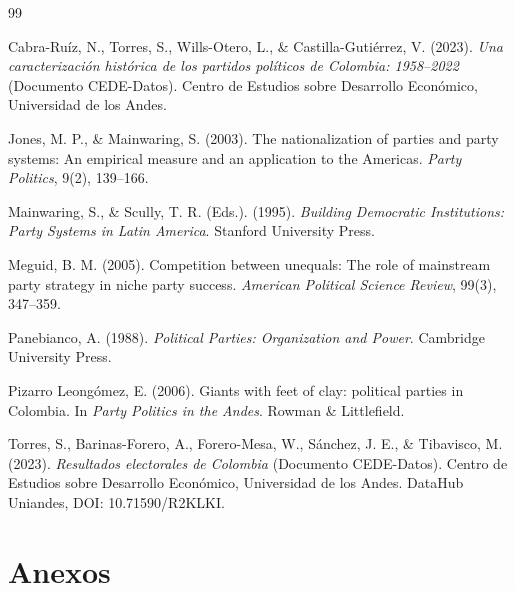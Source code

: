 \documentclass[11pt,letterpaper]{article}
\begin{document}
\begin{thebibliography}{99}
\setlength{\itemsep}{0.4em}

 Cabra-Ruíz, N., Torres, S., Wills-Otero, L., \& Castilla-Gutiérrez, V. (2023). \textit{Una caracterización histórica de los partidos políticos de Colombia: 1958--2022} (Documento CEDE-Datos). Centro de Estudios sobre Desarrollo Económico, Universidad de los Andes.

 Jones, M. P., \& Mainwaring, S. (2003). The nationalization of parties and party systems: An empirical measure and an application to the Americas. \textit{Party Politics}, 9(2), 139--166.

 Mainwaring, S., \& Scully, T. R. (Eds.). (1995). \textit{Building Democratic Institutions: Party Systems in Latin America}. Stanford University Press.

 Meguid, B. M. (2005). Competition between unequals: The role of mainstream party strategy in niche party success. \textit{American Political Science Review}, 99(3), 347--359.

 Panebianco, A. (1988). \textit{Political Parties: Organization and Power}. Cambridge University Press.

 Pizarro Leongómez, E. (2006). Giants with feet of clay: political parties in Colombia. In \textit{Party Politics in the Andes}. Rowman \& Littlefield.

 Torres, S., Barinas-Forero, A., Forero-Mesa, W., Sánchez, J. E., \& Tibavisco, M. (2023). \textit{Resultados electorales de Colombia} (Documento CEDE-Datos). Centro de Estudios sobre Desarrollo Económico, Universidad de los Andes. DataHub Uniandes, DOI: 10.71590/R2KLKI.

\end{thebibliography}

\newpage
\appendix
\section*{Anexos}
\renewcommand{\thetable}{A\arabic{table}}
\setcounter{table}{0}
\end{document}
